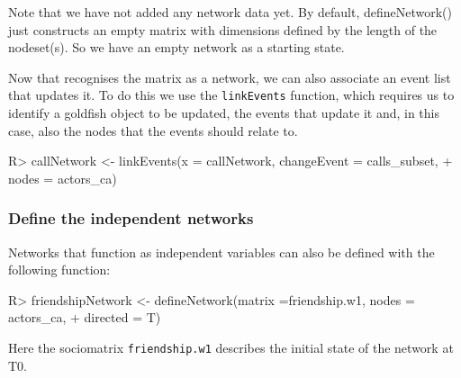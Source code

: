\documentclass[article]{jss}
\begin{document}
\begin{leftbar}
Note that we have not added any network data yet. By default, defineNetwork() just constructs an empty matrix with dimensions defined by the length of the nodeset(s). So we have an empty network as a starting state.
\end{leftbar}

Now that  recognises the matrix as a network, we can also associate an event list that updates it.
To do this we use the \texttt{linkEvents} function, which requires us to identify a goldfish object to be updated, the events that update it and, in this case, also the nodes that the events should relate to. 
%
\begin{Schunk}
\begin{Sinput}
R> callNetwork <- linkEvents(x = callNetwork, changeEvent = calls_subset, 
+                            nodes = actors_ca)
\end{Sinput}
\end{Schunk}
%


\subsubsection[Define the independent networks]{\textbf{Define the independent networks}} \label{subsubsec:indep_networks}


%
%


Networks that function as independent variables can also be defined with the following function:
%
\begin{Schunk}
\begin{Sinput}
R> friendshipNetwork <- defineNetwork(matrix =friendship.w1, nodes = actors_ca, 
+                                     directed = T)
\end{Sinput}
\end{Schunk}
%



Here the sociomatrix \texttt{friendship.w1} describes the initial state of the network at T0. 
\end{document}
